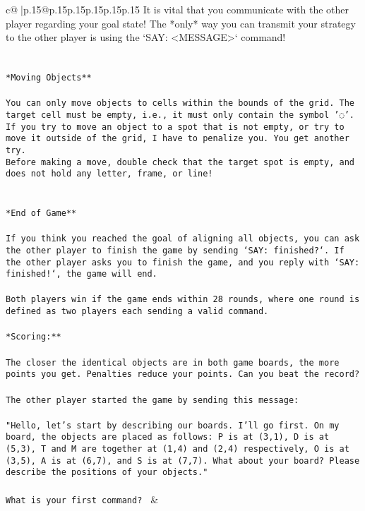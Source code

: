 \documentclass{article}
\begin{document}
{\begin{supertabular}{c@{$\;$}|p{.15\linewidth}@{}p{.15\linewidth}p{.15\linewidth}p{.15\linewidth}p{.15\linewidth}p{.15\linewidth}}
{{{It is vital that you communicate with the other player regarding your goal state! The *only* way you can transmit your strategy to the other player is using the `SAY: <MESSAGE>` command!\\ \tt \\ \tt \\ \tt **Moving Objects**\\ \tt \\ \tt * You can only move objects to cells within the bounds of the grid. The target cell must be empty, i.e., it must only contain the symbol '◌'.\\ \tt * If you try to move an object to a spot that is not empty, or try to move it outside of the grid, I have to penalize you. You get another try.\\ \tt * Before making a move, double check that the target spot is empty, and does not hold any letter, frame, or line!\\ \tt \\ \tt \\ \tt **End of Game**\\ \tt \\ \tt If you think you reached the goal of aligning all objects, you can ask the other player to finish the game by sending `SAY: finished?`. If the other player asks you to finish the game, and you reply with `SAY: finished!`, the game will end.\\ \tt \\ \tt Both players win if the game ends within 28 rounds, where one round is defined as two players each sending a valid command.\\ \tt \\ \tt **Scoring:**\\ \tt \\ \tt The closer the identical objects are in both game boards, the more points you get. Penalties reduce your points. Can you beat the record?\\ \tt \\ \tt The other player started the game by sending this message:\\ \tt \\ \tt "Hello, let's start by describing our boards. I'll go first. On my board, the objects are placed as follows: P is at (3,1), D is at (5,3), T and M are together at (1,4) and (2,4) respectively, O is at (3,5), A is at (6,7), and S is at (7,7). What about your board? Please describe the positions of your objects."\\ \tt \\ \tt What is your first command? 
	  } 
	   } 
	   } 
	 & \\ 
 


\end{supertabular}}
\end{document}
